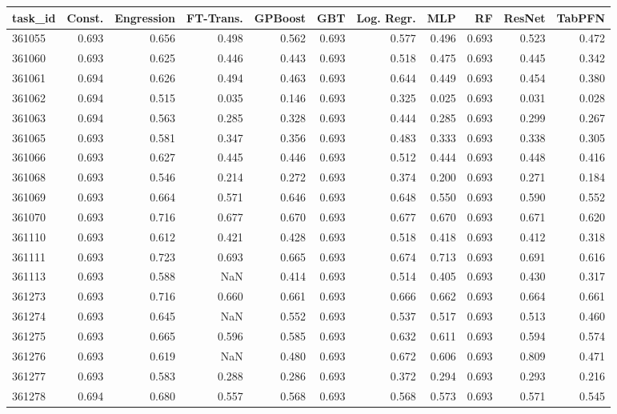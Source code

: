 \begin{tabular}{lrrrrrrrrrr}
\toprule
task\_id & Const. & Engression & FT-Trans. & GPBoost & GBT & Log. Regr. & MLP & RF & ResNet & TabPFN \\
\midrule
361055 & 0.693 & 0.656 & 0.498 & 0.562 & 0.693 & 0.577 & 0.496 & 0.693 & 0.523 & 0.472 \\
361060 & 0.693 & 0.625 & 0.446 & 0.443 & 0.693 & 0.518 & 0.475 & 0.693 & 0.445 & 0.342 \\
361061 & 0.694 & 0.626 & 0.494 & 0.463 & 0.693 & 0.644 & 0.449 & 0.693 & 0.454 & 0.380 \\
361062 & 0.694 & 0.515 & 0.035 & 0.146 & 0.693 & 0.325 & 0.025 & 0.693 & 0.031 & 0.028 \\
361063 & 0.694 & 0.563 & 0.285 & 0.328 & 0.693 & 0.444 & 0.285 & 0.693 & 0.299 & 0.267 \\
361065 & 0.693 & 0.581 & 0.347 & 0.356 & 0.693 & 0.483 & 0.333 & 0.693 & 0.338 & 0.305 \\
361066 & 0.693 & 0.627 & 0.445 & 0.446 & 0.693 & 0.512 & 0.444 & 0.693 & 0.448 & 0.416 \\
361068 & 0.693 & 0.546 & 0.214 & 0.272 & 0.693 & 0.374 & 0.200 & 0.693 & 0.271 & 0.184 \\
361069 & 0.693 & 0.664 & 0.571 & 0.646 & 0.693 & 0.648 & 0.550 & 0.693 & 0.590 & 0.552 \\
361070 & 0.693 & 0.716 & 0.677 & 0.670 & 0.693 & 0.677 & 0.670 & 0.693 & 0.671 & 0.620 \\
361110 & 0.693 & 0.612 & 0.421 & 0.428 & 0.693 & 0.518 & 0.418 & 0.693 & 0.412 & 0.318 \\
361111 & 0.693 & 0.723 & 0.693 & 0.665 & 0.693 & 0.674 & 0.713 & 0.693 & 0.691 & 0.616 \\
361113 & 0.693 & 0.588 & NaN & 0.414 & 0.693 & 0.514 & 0.405 & 0.693 & 0.430 & 0.317 \\
361273 & 0.693 & 0.716 & 0.660 & 0.661 & 0.693 & 0.666 & 0.662 & 0.693 & 0.664 & 0.661 \\
361274 & 0.693 & 0.645 & NaN & 0.552 & 0.693 & 0.537 & 0.517 & 0.693 & 0.513 & 0.460 \\
361275 & 0.693 & 0.665 & 0.596 & 0.585 & 0.693 & 0.632 & 0.611 & 0.693 & 0.594 & 0.574 \\
361276 & 0.693 & 0.619 & NaN & 0.480 & 0.693 & 0.672 & 0.606 & 0.693 & 0.809 & 0.471 \\
361277 & 0.693 & 0.583 & 0.288 & 0.286 & 0.693 & 0.372 & 0.294 & 0.693 & 0.293 & 0.216 \\
361278 & 0.694 & 0.680 & 0.557 & 0.568 & 0.693 & 0.568 & 0.573 & 0.693 & 0.571 & 0.545 \\

\end{tabular}
